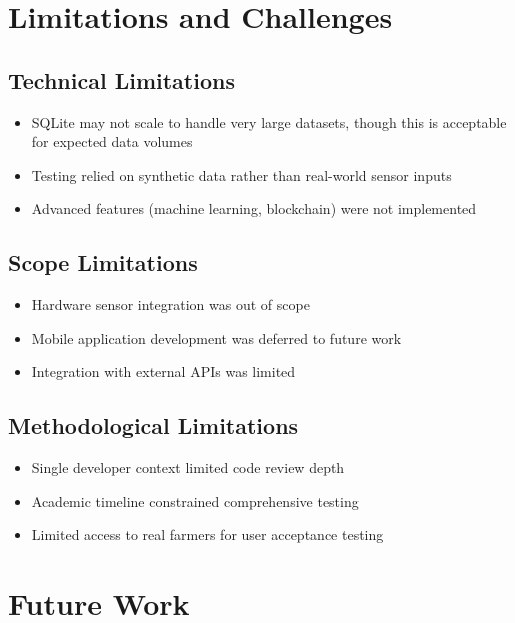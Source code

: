 \section{Limitations and Challenges}

\subsection{Technical Limitations}

\begin{itemize}
    \item SQLite may not scale to handle very large datasets, though this is acceptable for expected data volumes
    \item Testing relied on synthetic data rather than real-world sensor inputs
    \item Advanced features (machine learning, blockchain) were not implemented
\end{itemize}

\subsection{Scope Limitations}

\begin{itemize}
    \item Hardware sensor integration was out of scope
    \item Mobile application development was deferred to future work
    \item Integration with external APIs was limited
\end{itemize}

\subsection{Methodological Limitations}

\begin{itemize}
    \item Single developer context limited code review depth
    \item Academic timeline constrained comprehensive testing
    \item Limited access to real farmers for user acceptance testing
\end{itemize}

\section{Future Work}

